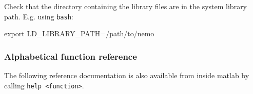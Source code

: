 \documentclass[a4paper]{article}
\newcommand{\command}[1]{\texttt{#1}}
\begin{document}
Check that the directory containing the library files are in the system library
path. E.g. using \command{bash}:

\begin{shell}
export LD_LIBRARY_PATH=/path/to/nemo
\end{shell}


\subsubsection{Alphabetical function reference}

The following reference documentation is also available from inside matlab by calling \texttt{help <function>}.





\end{document}
